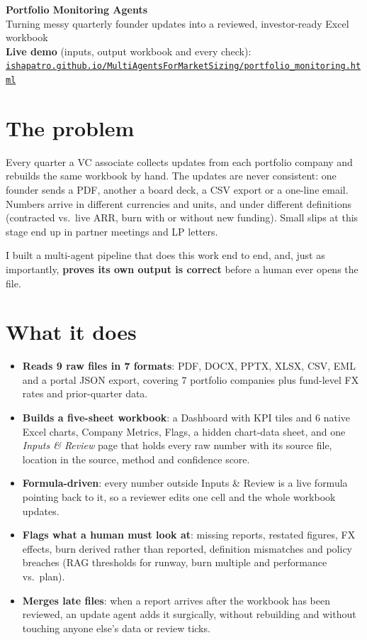 \documentclass[11pt,a4paper]{article}
\newcommand{\code}[1]{\texttt{\small #1}}
\begin{document}
{\LARGE\bfseries Portfolio Monitoring Agents}\\[2pt]
{\color{muted} Turning messy quarterly founder updates into a reviewed, investor-ready Excel workbook}\\[4pt]
\textbf{Live demo} (inputs, output workbook and every check):\\
\href{https://ishapatro.github.io/MultiAgentsForMarketSizing/portfolio_monitoring.html}{\color{accent}\code{ishapatro.github.io/MultiAgentsForMarketSizing/portfolio\_monitoring.html}}

\vspace{6pt}
\section{The problem}
Every quarter a VC associate collects updates from each portfolio company and rebuilds the same workbook by
hand. The updates are never consistent: one founder sends a PDF, another a board deck, a CSV export or a
one-line email. Numbers arrive in different currencies and units, and under different definitions (contracted
vs.\ live ARR, burn with or without new funding). Small slips at this stage end up in partner meetings and LP
letters.

I built a multi-agent pipeline that does this work end to end, and, just as importantly, \textbf{proves its
own output is correct} before a human ever opens the file.

\section{What it does}
\begin{itemize}
  \item \textbf{Reads 9 raw files in 7 formats}: PDF, DOCX, PPTX, XLSX, CSV, EML and a portal JSON export,
        covering 7 portfolio companies plus fund-level FX rates and prior-quarter data.
  \item \textbf{Builds a five-sheet workbook}: a Dashboard with KPI tiles and 6 native Excel charts, Company
        Metrics, Flags, a hidden chart-data sheet, and one \emph{Inputs \& Review} page that holds every raw
        number with its source file, location in the source, method and confidence score.
  \item \textbf{Formula-driven}: every number outside Inputs \& Review is a live formula pointing back to it,
        so a reviewer edits one cell and the whole workbook updates.
  \item \textbf{Flags what a human must look at}: missing reports, restated figures, FX effects, burn derived
        rather than reported, definition mismatches and policy breaches (RAG thresholds for runway, burn multiple
        and performance vs.\ plan).
  \item \textbf{Merges late files}: when a report arrives after the workbook has been reviewed, an update agent
        adds it surgically, without rebuilding and without touching anyone else's data or review ticks.
\end{itemize}
\end{document}
